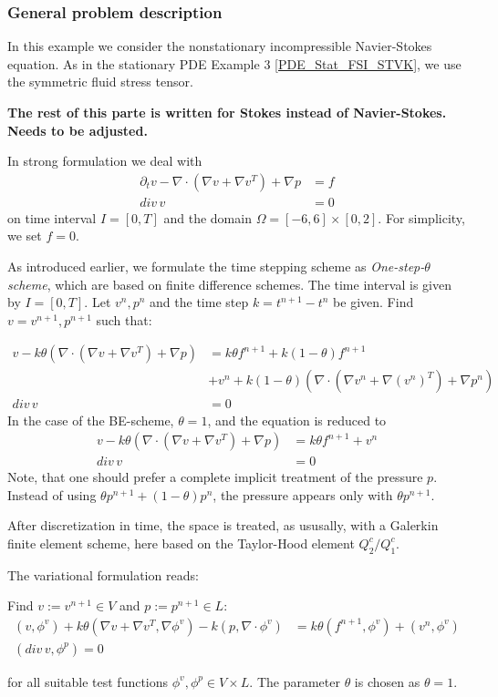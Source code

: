 \subsubsection{General problem description}
In this example we consider the nonstationary incompressible Navier-Stokes equation. As in the stationary PDE Example 3 \ref{PDE_Stat_FSI_STVK},
we use the symmetric fluid stress tensor.  

\textbf{The rest of this parte is written for Stokes instead of Navier-Stokes. Needs to be adjusted.}

In strong formulation we deal with 
\begin{align*}
\partial_t v -\nabla\cdot (\nabla v + \nabla v^{T}) + \nabla p &= f \\
div\, v &= 0 
\end{align*}
on time interval $I=[0,T]$ and the domain 
$\Omega = [-6,6]\times [0,2]$. For simplicity,  we set $f=0$.

As introduced earlier, 
we formulate the time stepping scheme as \textit{One-step-$\theta$ scheme},
which are based on finite difference schemes. 
The time interval is given by $I=[0,T]$. Let $v^n,p^n$ and the time
step $k=t^{n+1}-t^n$ be given. Find $v=v^{n+1}, p^{n+1}$ such that:

\begin{align*}
v - k\theta (\nabla\cdot (\nabla v + \nabla v^{T}) + \nabla p) &=
k\theta f^{n+1} + k(1-\theta)f^{n+1}\\
&+  v^n + k(1-\theta) (\nabla\cdot (\nabla v^n + \nabla (v^n)^{T}) 
+ \nabla p^n) \\
div \,v &= 0 
\end{align*}
In the case of the BE-scheme, $\theta = 1$, and the equation is reduced to
\begin{align*}
v - k\theta (\nabla\cdot (\nabla v + \nabla v^{T}) + \nabla p) &=
k\theta f^{n+1} +  v^n  \\
div \,v &= 0
\end{align*}
Note, that one should prefer a complete implicit treatment of the
pressure $p$. Instead of using $\theta p^{n+1} + (1-\theta)p^n$, the pressure
appears only with $\theta p^{n+1}$.

After discretization in time, the space is treated, as ususally, with 
a Galerkin finite element scheme, here based on the Taylor-Hood element 
$Q_2^c / Q_1^c$.

The variational formulation reads:

\begin{Problem}
Find $v:= v^{n+1}\in V$ and $p:= p^{n+1}\in L$:
\begin{align*}
(v,\phi^v) + k\theta (\nabla v + \nabla v^{T}, \nabla\phi^v) 
- k  (p, \nabla\cdot\phi^v) &=
k\theta (f^{n+1},\phi^v) +  (v^n,\phi^v)\\
(div \,v,\phi^p) = 0  
\end{align*}
\end{Problem}
for all suitable test functions ${\phi^v , \phi^p} \in V\times L$. 
The parameter $\theta$ is chosen as $\theta =1$.

